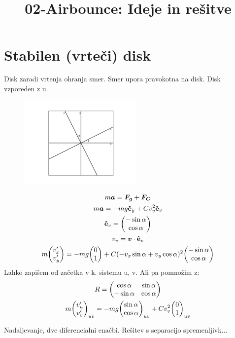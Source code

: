 \documentclass[11pt,a4paper]{article}
\title{02-Airbounce: Ideje in rešitve}
\date{}
\begin{document}
\maketitle

\section{Stabilen (vrteči) disk}
Disk zaradi vrtenja ohranja smer. Smer upora pravokotna na disk. Disk vzporeden z u.
\begin{figure}[H]
\centering
	\includegraphics[width=6cm]{stabilen_disk_kot_frizbija.png}
\end{figure}

\begin{gather}
m \bm{a} = \bm{{F_g}} + \bm{F_C}\\
m \bm{a} = -mg \vu{e}_y + C v_v^2 \vu{e}_v\\
\vu{e}_v = \mqty(-\sin \alpha \\ \cos \alpha)\\
v_v = \bm{v} \cdot \vu{e}_v\\
m \mqty(v_x' \\ v_y') = -mg \mqty(0 \\ 1) + C (-v_x \sin \alpha + v_y \cos \alpha)^2 \mqty(-\sin \alpha \\ \cos \alpha)
\end{gather}
Lahko zapišem od začetka v k. sistemu u, v. Ali pa pomnožim z:
\begin{gather}
R = \mqty(\cos \alpha & \sin \alpha \\ -\sin \alpha & \cos \alpha)\\
m \mqty(v_u' \\ v_v')_{uv} = -mg \mqty(\sin \alpha \\ \cos \alpha)_{uv} + C v_v^2 \mqty(0 \\ 1)_{uv}
\end{gather}

Nadaljevanje, dve diferencialni enačbi. Rešitev s separacijo spremenljivk...
\end{document}
